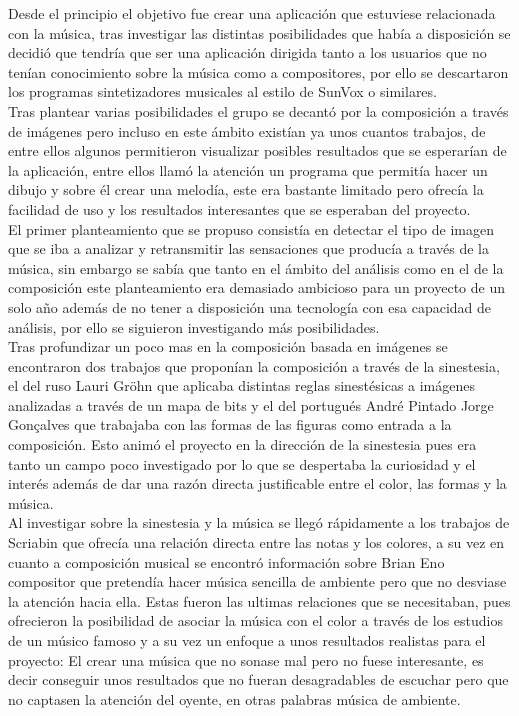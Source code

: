Desde el principio el objetivo fue crear una aplicación que estuviese relacionada con la música, tras investigar las distintas posibilidades que había a disposición se decidió que tendría que ser una aplicación dirigida tanto a los usuarios que no tenían conocimiento sobre la música como a compositores, por ello se descartaron los programas sintetizadores musicales al estilo de SunVox \cite{SunVox} o similares.
\\\newline
Tras plantear varias posibilidades el grupo se decantó por la composición a través de imágenes pero incluso en este ámbito existían ya unos cuantos trabajos, de entre ellos algunos permitieron visualizar posibles resultados que se esperarían de la aplicación, entre ellos llamó la atención un programa \cite{dibujosymusica} que permitía hacer un dibujo y sobre él crear una melodía, este era bastante limitado pero ofrecía la facilidad de uso y los resultados interesantes que se esperaban del proyecto.
\\\newline
El primer planteamiento que se propuso consistía en detectar el tipo de imagen que se iba a analizar y retransmitir las sensaciones que producía a través de la música, sin embargo se sabía que tanto en el ámbito del análisis como en el de la composición este planteamiento era demasiado ambicioso para un proyecto de un solo año además de no tener a disposición una tecnología con esa capacidad de análisis, por ello se siguieron investigando más posibilidades.
\\\newline
Tras profundizar un poco mas en la composición basada en imágenes se encontraron dos trabajos que proponían la composición a través de la sinestesia, el del ruso Lauri Gröhn \cite{rusofotos} que aplicaba distintas reglas sinestésicas a imágenes analizadas a través de un mapa de bits y el del portugués André Pintado Jorge Gonçalves \cite{portutesis} que trabajaba con las formas de las figuras como entrada a la composición. Esto animó el proyecto en la dirección de la sinestesia pues era tanto un campo poco investigado por lo que se despertaba la curiosidad y el interés además de dar una razón directa justificable entre el color, las formas y la música.
\\\newline
Al investigar sobre la sinestesia y la música se llegó rápidamente a los trabajos de Scriabin \cite{ScriabinQuintasColor} que ofrecía una relación directa entre las notas y los colores, a su vez en cuanto a composición musical se encontró información sobre Brian Eno \cite{BrianEnoInterview} compositor que pretendía hacer música sencilla de ambiente pero que no desviase la atención hacia ella. Estas fueron las ultimas relaciones que se necesitaban, pues ofrecieron la posibilidad de asociar la música con el color a través de los estudios de un músico famoso y a su vez un enfoque a unos resultados realistas para el proyecto: El crear una música que no sonase mal pero no fuese interesante, es decir conseguir unos resultados que no fueran desagradables de escuchar pero que no captasen la atención del oyente, en otras palabras música de ambiente.
